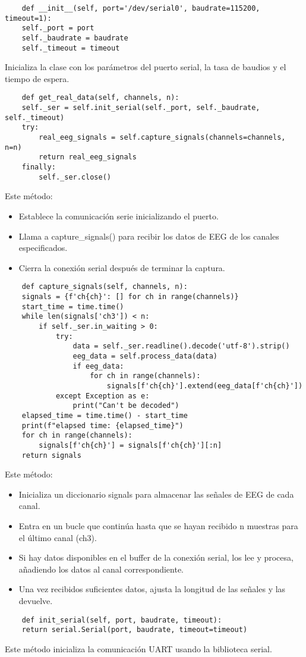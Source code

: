 \documentclass{article}
\begin{document}
\begin{lstlisting}
    def __init__(self, port='/dev/serial0', baudrate=115200, timeout=1):
    self._port = port
    self._baudrate = baudrate
    self._timeout = timeout
\end{lstlisting}
Inicializa la clase con los parámetros del puerto serial, la tasa de baudios y el tiempo de espera.

\begin{lstlisting}
    def get_real_data(self, channels, n):
    self._ser = self.init_serial(self._port, self._baudrate, self._timeout)
    try:
        real_eeg_signals = self.capture_signals(channels=channels, n=n)
        return real_eeg_signals
    finally:
        self._ser.close()
\end{lstlisting}
Este método:

\begin{itemize}
    \item Establece la comunicación serie inicializando el puerto.
    \item Llama a capture\_signals() para recibir los datos de EEG de los canales especificados.
    \item Cierra la conexión serial después de terminar la captura.
\end{itemize}

\begin{lstlisting}
    def capture_signals(self, channels, n):
    signals = {f'ch{ch}': [] for ch in range(channels)}
    start_time = time.time()
    while len(signals['ch3']) < n: 
        if self._ser.in_waiting > 0:
            try:
                data = self._ser.readline().decode('utf-8').strip()
                eeg_data = self.process_data(data)
                if eeg_data:
                    for ch in range(channels):
                        signals[f'ch{ch}'].extend(eeg_data[f'ch{ch}'])
            except Exception as e:
                print("Can't be decoded")
    elapsed_time = time.time() - start_time
    print(f"elapsed time: {elapsed_time}")
    for ch in range(channels):
        signals[f'ch{ch}'] = signals[f'ch{ch}'][:n]
    return signals
\end{lstlisting}
Este método:
\begin{itemize}
    \item Inicializa un diccionario signals para almacenar las señales de EEG de cada canal.
    \item Entra en un bucle que continúa hasta que se hayan recibido n muestras para el último canal (ch3).
    \item Si hay datos disponibles en el buffer de la conexión serial, los lee y procesa, añadiendo los datos al canal correspondiente.
    \item Una vez recibidos suficientes datos, ajusta la longitud de las señales y las devuelve.
\end{itemize}
\begin{lstlisting}
    def init_serial(self, port, baudrate, timeout):
    return serial.Serial(port, baudrate, timeout=timeout)
\end{lstlisting}
Este método inicializa la comunicación UART usando la biblioteca serial.
\end{document}
